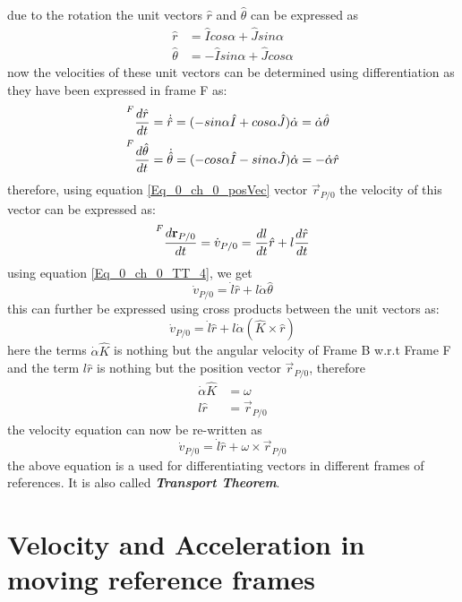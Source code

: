 due to the rotation the unit vectors $\hat{r}$ and $\hat{\theta}$ can be expressed as
\begin{align}
	\hat{r} &= \hat{I}cos\alpha + \hat{J}sin\alpha \\
	\hat{\theta} &= -\hat{I}sin\alpha + \hat{J}cos\alpha
\end{align}
now the velocities of these unit vectors can be determined using differentiation as they have been expressed in frame F as:
\begin{align}
	\prescript{F}{}{\frac{d \hat{r} }{dt}} &= \dot{\hat{r}} = (-sin\alpha \hat{I} + cos\alpha \hat{J})\dot{\alpha} = \dot{\alpha}\hat{\theta} \label{Eq_0_ch_0_TT_4} \\
	\prescript{F}{}{\frac{d \hat{\theta} }{dt}} &= \dot{\hat{\theta}} = (-cos\alpha \hat{I} - sin\alpha \hat{J})\dot{\alpha} = -\dot{\alpha}\hat{r}
\end{align}
therefore, using equation \ref{Eq_0_ch_0_posVec} vector $\vec{r}_{P/0}$ the velocity of this vector can be expressed as:
\begin{equation}
	\prescript{F}{}{\frac{d \vec{r}_{P/0}}{dt}} = \dot{v}_{P/0} = \frac{d l}{dt} \hat{r} + l \frac{d \hat{r}}{dt}
\end{equation}
using equation \eqref{Eq_0_ch_0_TT_4}, we get
\begin{equation}
	\dot{v}_{P/0} = \dot{l} \hat{r} + l \dot{\alpha}\hat{\theta}
\end{equation}
this can further be expressed using cross products between the unit vectors as:
\begin{equation}
\dot{v}_{P/0} = \dot{l} \hat{r} + l \dot{\alpha}(\hat{K} \times \hat{r})
\end{equation}
here the terms $\dot{\alpha}\hat{K}$ is nothing but the angular velocity of Frame B w.r.t Frame F and the term $l \hat{r}$ is nothing but the position vector $\vec{r}_{P/0}$, therefore
\begin{align*}
	\dot{\alpha}\hat{K} &= \omega \\
	l \hat{r} &= \vec{r}_{P/0}
\end{align*}
the velocity equation can now be re-written as
\begin{equation} \label{Eq_0_ch_0_TT}
	\dot{v}_{P/0} = \dot{l} \hat{r} + \omega \times \vec{r}_{P/0}
\end{equation}
the above equation is a used for differentiating vectors in different frames of references. It is also called \textbf{\textit{Transport Theorem}}.

\section{Velocity and Acceleration in moving reference frames}

